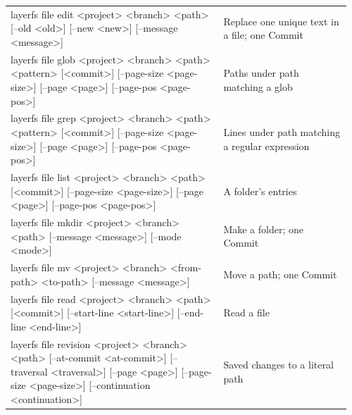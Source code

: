 {\begin{longtable}{@{}p{0.60\linewidth}@{\hspace{1em}}p{0.36\linewidth}@{}}
{\raggedright\ttfamily layerfs file edit \textless{}project\textgreater{} \textless{}branch\textgreater{} \textless{}path\textgreater{} [--old \textless{}old\textgreater{}] [--new \textless{}new\textgreater{}] [--message \textless{}message\textgreater{}]} & Replace one unique text in a file; one Commit \\
{\raggedright\ttfamily layerfs file glob \textless{}project\textgreater{} \textless{}branch\textgreater{} \textless{}path\textgreater{} \textless{}pattern\textgreater{} [\textless{}commit\textgreater{}] [--page-size \textless{}page-size\textgreater{}] [--page \textless{}page\textgreater{}] [--page-pos \textless{}page-pos\textgreater{}]} & Paths under path matching a glob \\
{\raggedright\ttfamily layerfs file grep \textless{}project\textgreater{} \textless{}branch\textgreater{} \textless{}path\textgreater{} \textless{}pattern\textgreater{} [\textless{}commit\textgreater{}] [--page-size \textless{}page-size\textgreater{}] [--page \textless{}page\textgreater{}] [--page-pos \textless{}page-pos\textgreater{}]} & Lines under path matching a regular expression \\
{\raggedright\ttfamily layerfs file list \textless{}project\textgreater{} \textless{}branch\textgreater{} \textless{}path\textgreater{} [\textless{}commit\textgreater{}] [--page-size \textless{}page-size\textgreater{}] [--page \textless{}page\textgreater{}] [--page-pos \textless{}page-pos\textgreater{}]} & A folder's entries \\
{\raggedright\ttfamily layerfs file mkdir \textless{}project\textgreater{} \textless{}branch\textgreater{} \textless{}path\textgreater{} [--message \textless{}message\textgreater{}] [--mode \textless{}mode\textgreater{}]} & Make a folder; one Commit \\
{\raggedright\ttfamily layerfs file mv \textless{}project\textgreater{} \textless{}branch\textgreater{} \textless{}from-path\textgreater{} \textless{}to-path\textgreater{} [--message \textless{}message\textgreater{}]} & Move a path; one Commit \\
{\raggedright\ttfamily layerfs file read \textless{}project\textgreater{} \textless{}branch\textgreater{} \textless{}path\textgreater{} [\textless{}commit\textgreater{}] [--start-line \textless{}start-line\textgreater{}] [--end-line \textless{}end-line\textgreater{}]} & Read a file \\
{\raggedright\ttfamily layerfs file revision \textless{}project\textgreater{} \textless{}branch\textgreater{} \textless{}path\textgreater{} [--at-commit \textless{}at-commit\textgreater{}] [--traversal \textless{}traversal\textgreater{}] [--page \textless{}page\textgreater{}] [--page-size \textless{}page-size\textgreater{}] [--continuation \textless{}continuation\textgreater{}]} & Saved changes to a literal path \\

\end{longtable}}
